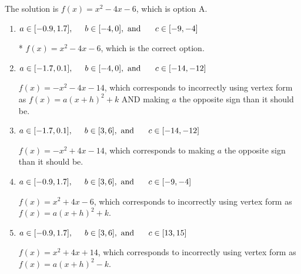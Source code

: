 \documentclass{extbook}[14pt]
\begin{document}
\begin{enumerate}
{The solution is \( f(x) = x^{2} -4 x -6 \), which is option A.\begin{enumerate}[label=\Alph*.]
\item \( a \in [-0.9, 1.7], \hspace*{5mm} b \in [-4, 0], \text{ and } \hspace*{5mm} c \in [-9, -4] \)

* $f(x)=x^{2} -4 x -6$, which is the correct option.
\item \( a \in [-1.7, 0.1], \hspace*{5mm} b \in [-4, 0], \text{ and } \hspace*{5mm} c \in [-14, -12] \)

$f(x)=-x^{2} -4 x -14$, which corresponds to incorrectly using vertex form as $f(x) = a(x+h)^2+k$ AND making $a$ the opposite sign than it should be.
\item \( a \in [-1.7, 0.1], \hspace*{5mm} b \in [3, 6], \text{ and } \hspace*{5mm} c \in [-14, -12] \)

$f(x)=-x^{2} +4 x -14$, which corresponds to making $a$ the opposite sign than it should be.
\item \( a \in [-0.9, 1.7], \hspace*{5mm} b \in [3, 6], \text{ and } \hspace*{5mm} c \in [-9, -4] \)

$f(x)=x^{2} +4 x -6$, which corresponds to incorrectly using vertex form as $f(x) = a(x+h)^2+k$.
\item \( a \in [-0.9, 1.7], \hspace*{5mm} b \in [3, 6], \text{ and } \hspace*{5mm} c \in [13, 15] \)

$f(x)=x^{2} +4 x + 14$, which corresponds to incorrectly using vertex form as $f(x) = a(x+h)^2 - k$.
\end{enumerate}

}
\end{enumerate}
\end{document}
